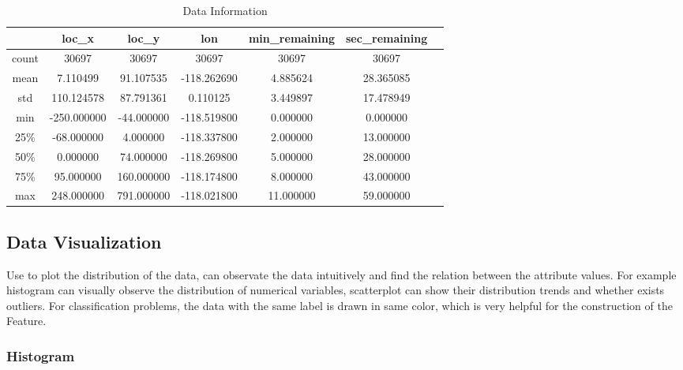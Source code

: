 \begin{table}[htbp]  \centering
	\caption{Data Information}
	\label{tbl:data information}		
	\begin{tabular}{ccccccc}
		\hline
		 & loc\_x & loc\_y & lon & min\_remaining & sec\_remaining \\
		\hline
		count & 30697 & 30697 & 30697 & 30697 & 30697  \\
		mean  & 7.110499	& 91.107535 & -118.262690 & 4.885624 & 28.365085\\
		std 	& 110.124578 & 87.791361 & 0.110125	& 3.449897 & 17.478949  \\
		min 	& -250.000000 & -44.000000 & -118.519800 & 0.000000	& 0.000000  \\
		25\%  & -68.000000 & 4.000000 & -118.337800 & 2.000000 & 13.000000\\
		50\%  & 0.000000	& 74.000000	& -118.269800	& 5.000000	& 28.000000	\\
		75\% & 95.000000 & 160.000000 & -118.174800 & 8.000000 & 43.000000 \\
		max  & 248.000000 & 791.000000 & -118.021800 & 11.000000 & 59.000000 \\
		\hline 
	\end{tabular}
\end{table}



\subsection{Data Visualization}
\DIFaddbegin \DIFadd{\
}\DIFaddend 

Use \DIFdelbegin {}\DIFdelend \DIFaddbegin {}\DIFaddend to plot the distribution of the data,
can observate the data intuitively and
find the relation between the attribute values. 
For example histogram can visually observe 
the distribution of numerical variables, 
scatterplot can show their distribution trends 
and whether exists outliers.
For classification problems, 
the data with the same label is drawn in same color, 
which is very helpful for 
the construction of the Feature.



\subsubsection{ Histogram}
\DIFaddbegin \DIFadd{\
}\DIFaddend 

